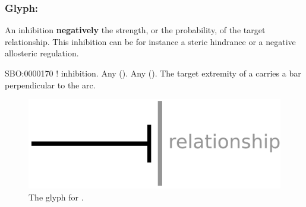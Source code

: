 
\subsubsection{Glyph: }\label{sec:inhibition}
\color{blue}

An inhibition \textbf{negatively}  the strength, or the probability, of the target relationship. This inhibition can be for instance a steric hindrance or a negative allosteric regulation.

\begin{glyphDescription}
 \glyphSboTerm SBO:0000170 ! inhibition.
 \glyphOrigin Any  ().
 \glyphTarget Any  ().
 \glyphEndPoint The target extremity of a  carries a bar perpendicular to the arc.
 \end{glyphDescription}

\begin{figure}[H]
  \centering
  \includegraphics[scale = 0.5]{images/inhibition}
  \caption{The \PD glyph for .}
  \label{fig:inhibition}
\end{figure}


